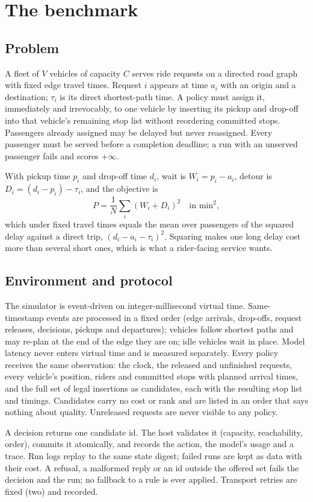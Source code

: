 \documentclass[11pt]{article}
\newcommand{\minsq}{\mathrm{min}^2}
\begin{document}
\section{The benchmark}
\label{sec:benchmark}

\subsection{Problem}
A fleet of $V$ vehicles of capacity $C$ serves ride requests on a directed road graph with fixed edge travel times. Request $i$ appears at time $a_i$ with an origin and a destination; $\tau_i$ is its direct shortest-path time. A policy must assign it, immediately and irrevocably, to one vehicle by inserting its pickup and drop-off into that vehicle's remaining stop list without reordering committed stops. Passengers already assigned may be delayed but never reassigned. Every passenger must be served before a completion deadline; a run with an unserved passenger fails and scores $+\infty$.

With pickup time $p_i$ and drop-off time $d_i$, wait is $W_i = p_i - a_i$, detour is $D_i = (d_i - p_i) - \tau_i$, and the objective is
\[
P = \frac{1}{N}\sum_i (W_i + D_i)^2
\quad\text{in } \minsq,
\]
which under fixed travel times equals the mean over passengers of the squared delay against a direct trip, $(d_i - a_i - \tau_i)^2$. Squaring makes one long delay cost more than several short ones, which is what a rider-facing service wants.

\subsection{Environment and protocol}
The simulator is event-driven on integer-millisecond virtual time. Same-timestamp events are processed in a fixed order (edge arrivals, drop-offs, request releases, decisions, pickups and departures); vehicles follow shortest paths and may re-plan at the end of the edge they are on; idle vehicles wait in place. Model latency never enters virtual time and is measured separately. Every policy receives the same observation: the clock, the released and unfinished requests, every vehicle's position, riders and committed stops with planned arrival times, and the full set of legal insertions as candidates, each with the resulting stop list and timings. Candidates carry no cost or rank and are listed in an order that says nothing about quality. Unreleased requests are never visible to any policy.

A decision returns one candidate id. The host validates it (capacity, reachability, order), commits it atomically, and records the action, the model's usage and a trace. Run logs replay to the same state digest; failed runs are kept as data with their cost. A refusal, a malformed reply or an id outside the offered set fails the decision and the run; no fallback to a rule is ever applied. Transport retries are fixed (two) and recorded.
\end{document}
